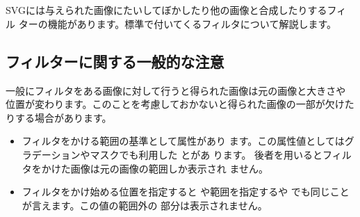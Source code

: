 \chapter{}
SVGには与えられた画像にたいしてぼかしたり他の画像と合成したりするフィル
ターの機能があります。標準で付いてくるフィルタについて解説します。
\section{フィルターに関する一般的な注意}
一般にフィルタをある画像に対して行うと得られた画像は元の画像と大きさや
位置が変わります。このことを考慮しておかないと得られた画像の一部が欠けた
りする場合があります。
\begin{itemize}
 \item フィルタをかける範囲の基準として属性があり
       ます。この属性値としてはグラデーションやマスクでも利用した
       とがあ
       ります。
       後者を用いるとフィルタをかけた画像は元の画像の範囲しか表示され
       ません。
 \item フィルタをかけ始める位置を指定すると
       や範囲を指定するや
       でも同じことが言えます。この値の範囲外の
       部分は表示されません。
\end{itemize}
